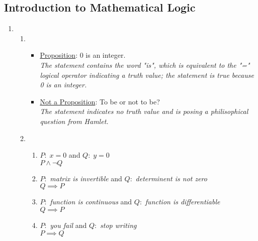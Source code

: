\subsection*{Introduction to Mathematical Logic}
\begin{enumerate}
      \item
            \begin{enumerate}[label=(\alph*), itemsep=16pt]
                  \item
                        \begin{itemize}
                              \item \underline{Proposition}: 0 is an integer. \\
                                    \textit{The statement contains the word "is", which is equivalent to the "=" logical operator indicating a truth value; the statement is true because 0 is an integer.}
                              \item \underline{Not a Proposition}: To be or not to be? \\
                                    \textit{The statement indicates no truth value and is posing a philisophical question from Hamlet.}
                        \end{itemize}

                  \item
                        \begin{enumerate}[label=(\roman*), itemsep=10pt]
                              \item $P:\;x=0$ and $Q:\;y=0$ \\
                                    $P\land \neg Q$

                              \item $P:$ \textit{matrix is invertible} and $Q:$ \textit{determinent is not zero} \\
                                    $Q \implies P$

                              \item $P:$ \textit{function is continuous} and $Q:$ \textit{function is differentiable} \\
                                    $Q \implies P$

                              \item $P:$ \textit{you fail} and $Q:$ \textit{stop writing} \\
                                    $P \implies Q$
                        \end{enumerate}
            \end{enumerate}


\end{enumerate}
